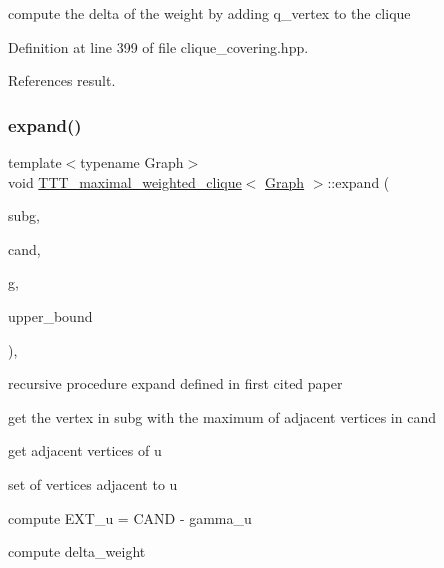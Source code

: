 compute the delta of the weight by adding q\+\_\+vertex to the clique 



Definition at line 399 of file clique\+\_\+covering.\+hpp.



References result.

\mbox{\label{classTTT__maximal__weighted__clique_a2fbe56bc02d8801552df3a0e161154be}} 
\subsubsection{\texorpdfstring{expand()}{expand()}}
{\footnotesize\ttfamily template$<$typename Graph$>$ \\
void \hyperlink{classTTT__maximal__weighted__clique}{T\+T\+T\+\_\+maximal\+\_\+weighted\+\_\+clique}$<$ \hyperlink{structGraph}{Graph} $>$\+::expand (\begin{DoxyParamCaption}\item[{\hyperlink{classCustomUnorderedSet}{Custom\+Unordered\+Set}$<$ \hyperlink{classTTT__maximal__weighted__clique_ac6a30ba8fb726c9c83eafe9dc451a799}{vertex} $>$ \&}]{subg,  }\item[{\hyperlink{classCustomUnorderedSet}{Custom\+Unordered\+Set}$<$ \hyperlink{classTTT__maximal__weighted__clique_ac6a30ba8fb726c9c83eafe9dc451a799}{vertex} $>$ \&}]{cand,  }\item[{const \hyperlink{structGraph}{Graph} \&}]{g,  }\item[{int}]{upper\+\_\+bound }\end{DoxyParamCaption})\hspace{0.3cm}{\ttfamily [inline]}, {\ttfamily [private]}}



recursive procedure expand defined in first cited paper 

get the vertex in subg with the maximum of adjacent vertices in cand

get adjacent vertices of u

set of vertices adjacent to u

compute E\+X\+T\+\_\+u = C\+A\+ND -\/ gamma\+\_\+u

compute delta\+\_\+weight 

